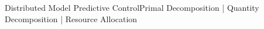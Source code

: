 \documentclass[aspectratio=169]{beamer}
\begin{document}
\begin{frame}{Distributed Model Predictive Control}{Primal Decomposition | Quantity Decomposition | Resource Allocation}
\begin{overlayarea}{\textwidth}{.5\textwidth}

\end{overlayarea}
\end{frame}
\end{document}
